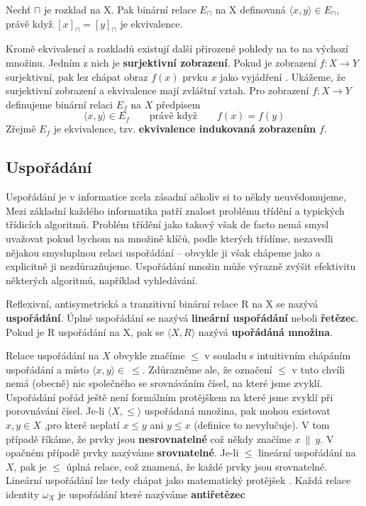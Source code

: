 \begin{sentence}
	Nechť $\sqcap$ je rozklad na X. Pak binární relace $E_\sqcap$ na X definovaná $\langle x,y \rangle \in E_\sqcap$, právě když $[x]_\sqcap = [y]_\sqcap$ je ekvivalence.
\end{sentence}

Kromě ekvivalencí a rozkladů existují další přirozené pohledy na to  na výchozí množinu. Jedním z nich je \textbf{surjektivní zobrazení}. Pokud je zobrazení $f : X \rightarrow Y$ surjektivní, pak lez chápat obraz $f(x)$ prvku $x$ jako vyjádření . Ukážeme, že surjektivní zobrazení a ekvivalence mají zvláštní vztah. Pro zobrazení $f : X \rightarrow Y$ definujeme binární relaci $E_f$ na $X$ předpisem $$\langle x , y \rangle \in E_f \qquad \text{právě když} \qquad f(x) = f(y)$$
Zřejmě $E_f$ je ekvivalence, tzv. \textbf{ekvivalence indukovaná zobrazením} $f$.

\subsection{Uspořádání}
Uspořádání je v informatice zcela zásadní ačkoliv si to někdy neuvědomujeme, Mezi základní každého informatika patří znalost problému třídění a typických třídicích algoritmů. Problém třídění jako takový však de facto nemá smysl uvažovat pokud bychom na množině klíčů, podle kterých třídíme, nezavedli nějakou smysluplnou relaci uspořádání -- obvykle ji však chápeme jako  a explicitně ji nezdůrazňujeme. Uspořádání množin může výrazně zvýšit efektivitu některých algoritmů, například vyhledávání.

\begin{definition}
	Reflexivní, antisymetrická a tranzitivní binární relace R na X se nazývá \textbf{uspořádání}. Úplné uspořádání se nazývá \textbf{lineární uspořádání} neboli \textbf{řetězec}. Pokud je R uspořádání na X, pak se $\langle X, R \rangle$ nazývá \textbf{upořádáná množina}.
\end{definition}

Relace uspořádání na $X$ obvykle značíme $\leq$ v souladu s intuitivním chápáním uspořádání a místo $\langle x ,y \rangle \in \ \leq$. Zdůrazněme ale, že označení $\leq$ v tuto chvíli nemá (obecně) nic společného se srovnáváním čísel, na které jsme zvyklí. Uspořádání pořád ještě není formálním protějškem  na které jsme zvyklí při porovnávání čísel. Je-li $\langle X, \leq \rangle$ uspořádaná množina, pak mohou  existovat $x,y \in X$ ,pro které neplatí $x \leq y$ ani $y \leq x$ (definice to nevylučuje). V tom případě říkáme, že prvky jsou \textbf{nesrovnatelné} což někdy značíme $x\ \| \ y$. V opačném případě prvky nazýváme \textbf{srovnatelné}. Je-li $\leq$ lineární uspořádání na $X$, pak je $\leq$ úplná relace, což znamená, že každé prvky jsou srovnatelné. Lineární uspořádání lze tedy chápat jako matematický protějšek . Každá relace identity $\omega_X$ je uspořádání které nazýváme \textbf{antiřetězec}

